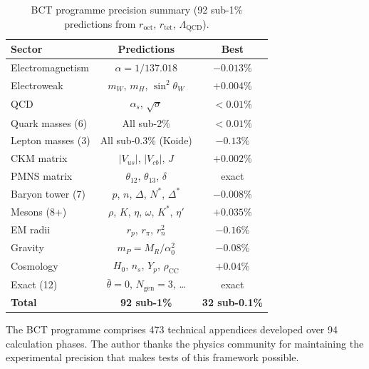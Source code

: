 \documentclass[aps,prl,reprint,superscriptaddress,showpacs]{revtex4-2}
\begin{document}
\begin{table}[b]
\caption{\label{tab:summary}%
BCT programme precision summary (92 sub-1\% predictions from
$r_{\mathrm{oct}}$, $r_{\mathrm{tet}}$, $\Lambda_{\mathrm{QCD}}$).}
\begin{tabular}{@{}lcc@{}}
\toprule
\textrm{Sector} & \textrm{Predictions} & \textrm{Best} \\
\midrule
Electromagnetism     & $\alpha = 1/137.018$ & $-0.013\%$ \\
Electroweak          & $m_W$, $m_H$, $\sin^2\theta_W$ & $+0.004\%$ \\
QCD                  & $\alpha_s$, $\sqrt{\sigma}$ & $<0.01\%$ \\
Quark masses (6)     & All sub-2\% & $<0.01\%$ \\
Lepton masses (3)    & All sub-0.3\% (Koide) & $-0.13\%$ \\
CKM matrix           & $|V_{us}|$, $|V_{cb}|$, $J$ & $+0.002\%$ \\
PMNS matrix          & $\theta_{12}$, $\theta_{13}$, $\delta$ & exact \\
Baryon tower (7)     & $p$, $n$, $\Delta$, $N^*$, $\Delta^*$ & $-0.008\%$ \\
Mesons (8+)          & $\rho$, $K$, $\eta$, $\omega$, $K^*$, $\eta'$ & $+0.035\%$ \\
EM radii             & $r_p$, $r_\pi$, $r_n^2$ & $-0.16\%$ \\
Gravity              & $m_P = M_R/\alpha_0^2$ & $-0.08\%$ \\
Cosmology            & $H_0$, $n_s$, $Y_p$, $\rho_{\mathrm{CC}}$ & $+0.04\%$ \\
Exact (12)           & $\bar{\theta}=0$, $N_{\mathrm{gen}}\!=\!3$, \ldots & exact \\
\midrule
\textbf{Total}       & \textbf{92 sub-1\%} & \textbf{32 sub-0.1\%} \\
\bottomrule
\end{tabular}
\end{table}

\begin{acknowledgments}
The BCT programme comprises 473 technical appendices developed over
94 calculation phases. The author thanks the physics community for
maintaining the experimental precision that makes tests of this
framework possible.
\end{acknowledgments}
\end{document}
